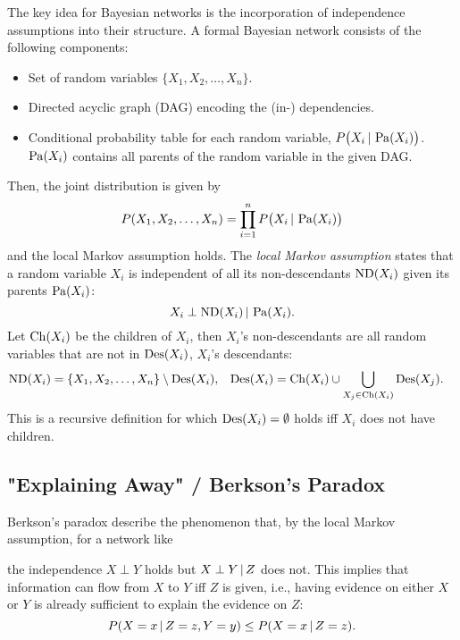 		The key idea for Bayesian networks is the incorporation of independence assumptions into their structure. A formal Bayesian network consists of the following components:
		\begin{itemize}
			\item Set of random variables \( \{ X_1, X_2, \dots, X_n \} \).
			\item Directed acyclic graph (DAG) encoding the (in-) dependencies.
			\item Conditional probability table for each random variable, \( P\bigl( X_i \,\vert\, \operatorname{Pa}(X_i) \bigr) \). \( \operatorname{Pa}(X_i) \) contains all parents of the random variable in the given DAG.
		\end{itemize}
		Then, the joint distribution is given by
		\begin{equation}
			P(X_1, X_2, \dots, X_n) = \prod_{i = 1}^{n} P\bigl( X_i \,\vert\, \operatorname{Pa}(X_i) \bigr)  \label{eq:bayesNetJoint}
		\end{equation}
		and the local Markov assumption holds. The \emph{local Markov assumption} states that a random variable \(X_i\) is independent of all its non-descendants \( \operatorname{ND}(X_i) \) given its parents \( \operatorname{Pa}(X_i) \):
		\begin{equation}
			X_i \perp \operatorname{ND}(X_i) \,\vert\, \operatorname{Pa}(X_i).
		\end{equation}
		Let \( \operatorname{Ch}(X_i) \) be the children of \(X_i\), then \(X_i\)'s non-descendants are all random variables that are not in \( \operatorname{Des}(X_i) \), \(X_i\)'s descendants:
		\begin{align}
			\operatorname{ND}(X_i) &= \{ X_1, X_2, \dots, X_n \} \setminus \operatorname{Des}(X_i), &
			\operatorname{Des}(X_i) &= \operatorname{Ch}(X_i) \cup \bigcup_{X_j \in \operatorname{Ch}(X_i)} \operatorname{Des}(X_j).
		\end{align}
		This is a recursive definition for which \( \operatorname{Des}(X_i) = \emptyset \) holds iff \( X_i \) does not have children.

		\subsection{"Explaining Away" / Berkson's Paradox}
			\label{subsec:berkson}

			Berkson's paradox describe the phenomenon that, by the local Markov assumption, for a network like
			\begin{center}
			\end{center}
			the independence \( X \perp Y \) holds but \( X \perp Y \,\vert\, Z \) does not. This implies that information can flow from \(X\) to \(Y\) iff \(Z\) is given, i.e., having evidence on either \(X\) or \(Y\) is already sufficient to explain the evidence on \(Z\):
			\begin{equation}
				P(X = x \,\vert\, Z = z, Y = y) \leq P(X = x \,\vert\, Z = z).
			\end{equation}

